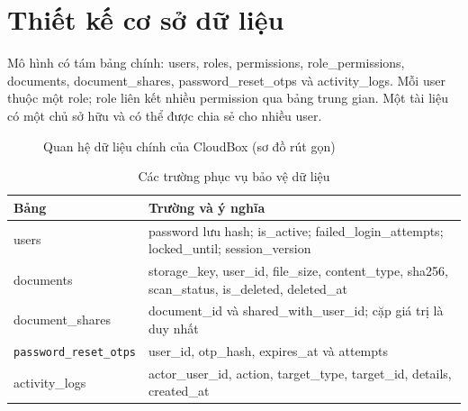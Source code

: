 \section{Thiết kế cơ sở dữ liệu}
Mô hình có tám bảng chính: users, roles, permissions, role\_permissions, documents, document\_shares, password\_reset\_otps và activity\_logs. Mỗi user thuộc một role; role liên kết nhiều permission qua bảng trung gian. Một tài liệu có một chủ sở hữu và có thể được chia sẻ cho nhiều user.
\begin{figure}[htbp]\centering
{}
\caption{Quan hệ dữ liệu chính của CloudBox (sơ đồ rút gọn)}
\end{figure}
\begin{table}[htbp]\centering\small
\caption{Các trường phục vụ bảo vệ dữ liệu}
\begin{tabularx}{\textwidth}{P{3.1cm}X}\toprule
\textbf{Bảng}&\textbf{Trường và ý nghĩa}\\\midrule
users & password lưu hash; is\_active; failed\_login\_attempts; locked\_until; session\_version\\
documents & storage\_key, user\_id, file\_size, content\_type, sha256, scan\_status, is\_deleted, deleted\_at\\
document\_shares & document\_id và shared\_with\_user\_id; cặp giá trị là duy nhất\\
\nolinkurl{password_reset_otps} & user\_id, otp\_hash, expires\_at và attempts\\
activity\_logs & actor\_user\_id, action, target\_type, target\_id, details, created\_at\\\bottomrule
\end{tabularx}\end{table}
